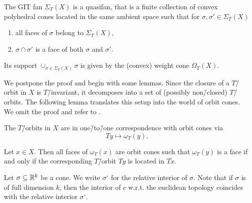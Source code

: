 \begin{theorem}
	\label{theorem:git_fan}
	The GIT fan $\Sigma_T(X)$ is a quasifan, that is a finite collection of convex polyhedral cones located in the same ambient space such that for $\sigma, \sigma'\in \Sigma_T(X)$
	\begin{enumerate}[label={\upshape(\roman*)}]
		\item all faces of $\sigma$ belong to $\Sigma_T(X)$,
		\item $\sigma \cap \sigma'$ is a face of both $\sigma$ and $\sigma'$.
	\end{enumerate}
	Its support $\cup_{\sigma\in\Sigma_T(X)}\sigma$ is given by the (convex) weight cone $\Omega_T(X)$.
\end{theorem}

We postpone the proof and begin with some lemmas. Since the closure of a $T$\=/orbit in $X$ is $T$\=/invariant, it decomposes into a set of (possibly non\=/closed) $T$\=/orbits. The following lemma translates this setup into the world of orbit cones. We omit the proof and refer to \cite{git_equivalence}.

\begin{lemma}
	\label{lemma:orbits_correspond_to_orbit_cones}
	The $T$\=/orbits in $X$ are in one\=/to\=/one correspondence with orbit cones via
	$$Ty \mapsto \omega_T(y).$$
	
	Let $x\in X$. Then all faces of $\omega_T(x)$ are orbit cones such that $\omega_T(y)$ is a face if and only if the corresponding $T$\=/orbit $Ty$ is located in $\overline{Tx}$.
\end{lemma}

\begin{notation}
	Let $\sigma\subseteq \mathbb{R}^k$ be a cone. We write $\sigma^\circ$ for the relative interior of $\sigma$. Note that if $\sigma$ is of full dimension $k$, then the interior of $c$ w.r.t. the euclidean topology coincides with the relative interior $\sigma^\circ$.
\end{notation}

